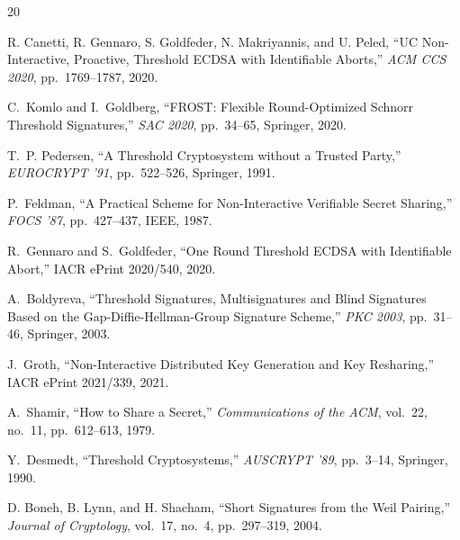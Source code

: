 \documentclass[11pt,a4paper]{article}
\begin{document}
\begin{thebibliography}{20}

R. Canetti, R. Gennaro, S. Goldfeder, N. Makriyannis, and U. Peled, ``UC
Non-Interactive, Proactive, Threshold ECDSA with Identifiable Aborts,''
\emph{ACM CCS 2020}, pp.~1769--1787, 2020.

C.~Komlo and I.~Goldberg, ``FROST: Flexible Round-Optimized Schnorr Threshold
Signatures,'' \emph{SAC 2020}, pp.~34--65, Springer, 2020.

T.~P. Pedersen, ``A Threshold Cryptosystem without a Trusted Party,''
\emph{EUROCRYPT '91}, pp.~522--526, Springer, 1991.

P.~Feldman, ``A Practical Scheme for Non-Interactive Verifiable Secret Sharing,''
\emph{FOCS '87}, pp.~427--437, IEEE, 1987.

R.~Gennaro and S.~Goldfeder, ``One Round Threshold ECDSA with Identifiable Abort,''
IACR ePrint 2020/540, 2020.

A.~Boldyreva, ``Threshold Signatures, Multisignatures and Blind Signatures Based on
the Gap-Diffie-Hellman-Group Signature Scheme,'' \emph{PKC 2003}, pp.~31--46,
Springer, 2003.

J.~Groth, ``Non-Interactive Distributed Key Generation and Key Resharing,''
IACR ePrint 2021/339, 2021.

A.~Shamir, ``How to Share a Secret,'' \emph{Communications of the ACM}, vol.~22,
no.~11, pp.~612--613, 1979.

Y.~Desmedt, ``Threshold Cryptosystems,'' \emph{AUSCRYPT '89}, pp.~3--14,
Springer, 1990.

D. Boneh, B. Lynn, and H. Shacham, ``Short Signatures from the Weil Pairing,''
\emph{Journal of Cryptology}, vol.~17, no.~4, pp.~297--319, 2004.

\end{thebibliography}
\end{document}

